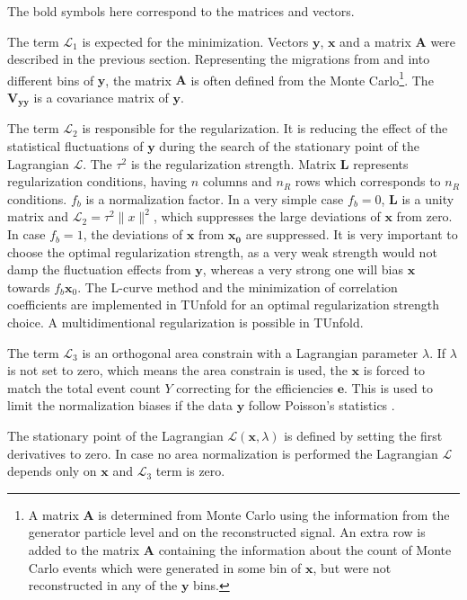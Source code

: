 The bold symbols here correspond to the matrices and vectors.

The term $\mathcal{L}_{1}$ is expected for the minimization. Vectors $\mathbf{y}$, $\mathbf{x}$ and a matrix $\mathbf{A}$ were
described in the previous section. Representing the migrations from and into different bins of $\mathbf{y}$, the matrix $\mathbf{A}$
is often defined from the Monte Carlo\footnote{A matrix $\mathbf{A}$ is
determined from Monte Carlo using the information from the generator particle level and on the reconstructed signal. An extra row is added
to the matrix $\mathbf{A}$ containing the information about the count of Monte Carlo events which were generated in some bin of $\mathbf{x}$,
but were not reconstructed in any of the $\mathbf{y}$ bins.}.
The $\mathbf{V_{yy}}$ is a covariance matrix of $\mathbf{y}$. 

The term $\mathcal{L}_{2}$ is responsible for the regularization. It is reducing the effect of the statistical fluctuations of $\mathbf{y}$
during the search of the stationary point of the Lagrangian $\mathcal{L}$. The $\tau^{2}$ is the regularization strength. Matrix $\mathbf{L}$
represents regularization conditions, having $n$ columns and $n_{R}$ rows which corresponds to $n_{R}$ conditions. $f_{b}$ is a normalization 
factor. In a very simple case $f_{b} = 0$, $\mathbf{L}$ is a unity matrix and $\mathcal{L}_{2} = \tau^{2} \parallel x \parallel^{2}$, which
suppresses the large deviations of $\mathbf{x}$ from zero. In case $f_{b} = 1$, the deviations of $\mathbf{x}$ from $\mathbf{x_{0}}$ are
suppressed. It is very important to choose the optimal regularization strength, as a very weak strength would not damp the fluctuation effects
from $\mathbf{y}$, whereas a very strong one will bias $\mathbf{x}$ towards $f_{b}\mathbf{x}_{0}$. The L-curve method \cite{Hansen00thel-curve} and the minimization
of correlation coefficients \cite{VBlobelT} are implemented in TUnfold for an optimal regularization strength choice. A multidimentional
regularization is possible in TUnfold.

The term $\mathcal{L}_{3}$ is an orthogonal area constrain with a Lagrangian parameter $\lambda$. If $\lambda$ is not set to zero,
which means the area constrain is used, the $\mathbf{x}$ is forced to match the total event count $Y$ correcting for the efficiencies $\mathbf{e}$.
This is used to limit the normalization biases if the data $\mathbf{y}$ follow Poisson's statistics \cite{Cowan98}.

The stationary point of the Lagrangian $\mathcal{L}(\mathbf{x}, \lambda)$ is defined by setting the first derivatives to zero. In case no 
area normalization is performed the Lagrangian $\mathcal{L}$ depends only on $\mathbf{x}$ and $\mathcal{L}_{3}$ term is zero.

